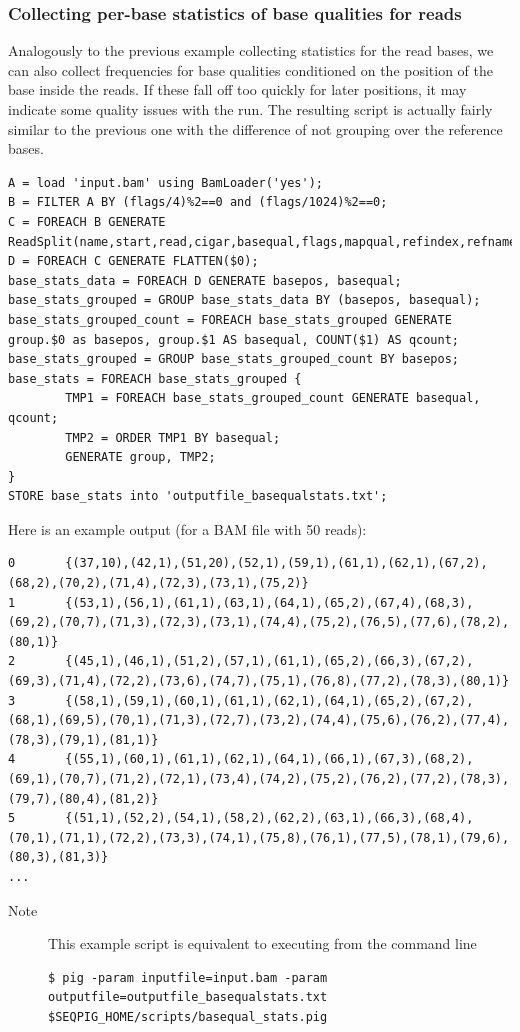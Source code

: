 \subsubsection{Collecting per-base statistics of base qualities for reads}
Analogously to the previous example collecting statistics for the read bases, we can also collect
frequencies for base qualities conditioned on the position of the base inside
the reads. If these fall off too quickly for later positions, it may
indicate some quality issues with the run. The resulting script is actually
fairly similar to the previous one with the difference of not grouping
over the reference bases.
\begin{lstlisting}
A = load 'input.bam' using BamLoader('yes');
B = FILTER A BY (flags/4)%2==0 and (flags/1024)%2==0;
C = FOREACH B GENERATE ReadSplit(name,start,read,cigar,basequal,flags,mapqual,refindex,refname,attributes#'MD');
D = FOREACH C GENERATE FLATTEN($0);
base_stats_data = FOREACH D GENERATE basepos, basequal;
base_stats_grouped = GROUP base_stats_data BY (basepos, basequal);
base_stats_grouped_count = FOREACH base_stats_grouped GENERATE group.$0 as basepos, group.$1 AS basequal, COUNT($1) AS qcount;
base_stats_grouped = GROUP base_stats_grouped_count BY basepos;
base_stats = FOREACH base_stats_grouped {
        TMP1 = FOREACH base_stats_grouped_count GENERATE basequal, qcount;
        TMP2 = ORDER TMP1 BY basequal;
        GENERATE group, TMP2;
}
STORE base_stats into 'outputfile_basequalstats.txt';
\end{lstlisting}
Here is an example output (for a BAM file with 50 reads):
\begin{lstlisting}
0       {(37,10),(42,1),(51,20),(52,1),(59,1),(61,1),(62,1),(67,2),(68,2),(70,2),(71,4),(72,3),(73,1),(75,2)}
1       {(53,1),(56,1),(61,1),(63,1),(64,1),(65,2),(67,4),(68,3),(69,2),(70,7),(71,3),(72,3),(73,1),(74,4),(75,2),(76,5),(77,6),(78,2),(80,1)}
2       {(45,1),(46,1),(51,2),(57,1),(61,1),(65,2),(66,3),(67,2),(69,3),(71,4),(72,2),(73,6),(74,7),(75,1),(76,8),(77,2),(78,3),(80,1)}
3       {(58,1),(59,1),(60,1),(61,1),(62,1),(64,1),(65,2),(67,2),(68,1),(69,5),(70,1),(71,3),(72,7),(73,2),(74,4),(75,6),(76,2),(77,4),(78,3),(79,1),(81,1)}
4       {(55,1),(60,1),(61,1),(62,1),(64,1),(66,1),(67,3),(68,2),(69,1),(70,7),(71,2),(72,1),(73,4),(74,2),(75,2),(76,2),(77,2),(78,3),(79,7),(80,4),(81,2)}
5       {(51,1),(52,2),(54,1),(58,2),(62,2),(63,1),(66,3),(68,4),(70,1),(71,1),(72,2),(73,3),(74,1),(75,8),(76,1),(77,5),(78,1),(79,6),(80,3),(81,3)}
...
\end{lstlisting}
\begin{description}
	\item[Note] This example script is equivalent to executing from the command line
\begin{lstlisting}
$ pig -param inputfile=input.bam -param outputfile=outputfile_basequalstats.txt $SEQPIG_HOME/scripts/basequal_stats.pig
\end{lstlisting}
\end{description}

